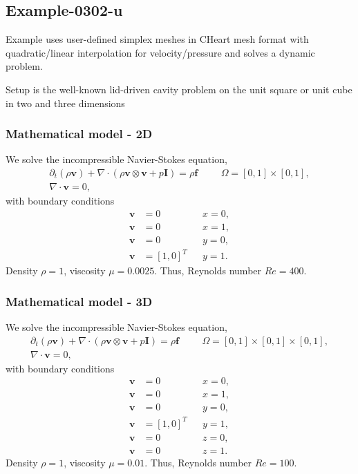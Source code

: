%
\clearpage
%
\subsection{Example-0302-u}
%
Example uses user-defined simplex meshes in CHeart mesh format with
quadratic/linear interpolation for velocity/pressure
and solves a dynamic problem.

Setup is the well-known lid-driven cavity problem
on the unit square or unit cube in two and three dimensions
%
%
\subsubsection{Mathematical model - 2D}
%
We solve the incompressible Navier-Stokes equation,
%
\begin{align}
    \partial_{t} (\rho \boldsymbol{v}) + \nabla \cdot (\rho \boldsymbol{v} \otimes \boldsymbol{v} + p \boldsymbol{I}) = \rho \boldsymbol{f} & &&\Omega = [0, 1] \times [0, 1], \\
    \nabla \cdot \boldsymbol{v} = 0,
\end{align}
%
with boundary conditions
%
\begin{align}
    \boldsymbol{v} &= 0         &&x = 0, \\
    \boldsymbol{v} &= 0         &&x = 1, \\
    \boldsymbol{v} &= 0         &&y = 0, \\
    \boldsymbol{v} &= [1, 0]^T  &&y = 1.
\end{align}
%
Density $\rho = 1$, viscosity $\mu = 0.0025$. Thus, Reynolds number $Re = 400$.
%
%
\subsubsection{Mathematical model - 3D}
%
We solve the incompressible Navier-Stokes equation,
%
\begin{align}
    \partial_{t} (\rho \boldsymbol{v}) + \nabla \cdot (\rho \boldsymbol{v} \otimes \boldsymbol{v} + p \boldsymbol{I}) = \rho \boldsymbol{f} & &&\Omega = [0, 1] \times [0, 1] \times [0, 1], \\
    \nabla \cdot \boldsymbol{v} = 0,
\end{align}
%
with boundary conditions
%
\begin{align}
    \boldsymbol{v} &= 0         &&x = 0, \\
    \boldsymbol{v} &= 0         &&x = 1, \\
    \boldsymbol{v} &= 0         &&y = 0, \\
    \boldsymbol{v} &= [1, 0]^T  &&y = 1, \\
    \boldsymbol{v} &= 0         &&z = 0, \\
    \boldsymbol{v} &= 0         &&z = 1.
\end{align}
%
Density $\rho = 1$, viscosity $\mu = 0.01$. Thus, Reynolds number $Re = 100$.
%
%
